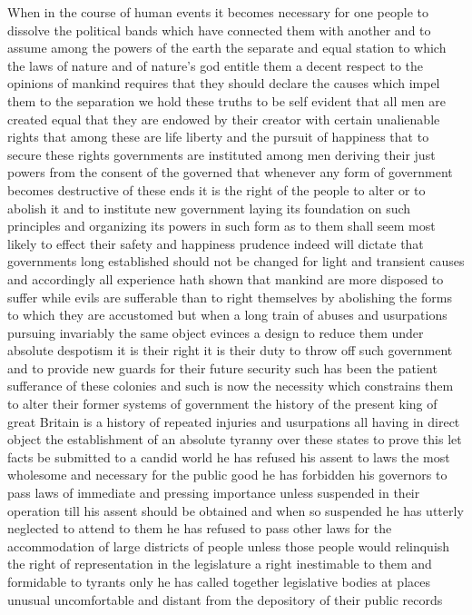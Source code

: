 When in the course of human events it becomes necessary for one people
to dissolve the political bands which have connected them with another
and to assume among the powers of the earth the separate and equal
station to which the laws of nature and of nature's god entitle them a
decent respect to the opinions of mankind requires that they should
declare the causes which impel them to the separation we hold these
truths to be self evident that all men are created equal that they are
endowed by their creator with certain unalienable rights that among
these are life liberty and the pursuit of happiness that to secure these
rights governments are instituted among men deriving their just powers
from the consent of the governed that whenever any form of government
becomes destructive of these ends it is the right of the people to alter
or to abolish it and to institute new government laying its foundation
on such principles and organizing its powers in such form as to them
shall seem most likely to effect their safety and happiness prudence
indeed will dictate that governments long established should not be
changed for light and transient causes and accordingly all experience
hath shown that mankind are more disposed to suffer while evils are
sufferable than to right themselves by abolishing the forms to which
they are accustomed but when a long train of abuses and usurpations
pursuing invariably the same object evinces a design to reduce them
under absolute despotism it is their right it is their duty to throw off
such government and to provide new guards for their future security such
has been the patient sufferance of these colonies and such is now the
necessity which constrains them to alter their former systems of
government the history of the present king of great Britain is a history
of repeated injuries and usurpations all having in direct object the
establishment of an absolute tyranny over these states to prove this let
facts be submitted to a candid world he has refused his assent to laws
the most wholesome and necessary for the public good he has forbidden
his governors to pass laws of immediate and pressing importance unless
suspended in their operation till his assent should be obtained and when
so suspended he has utterly neglected to attend to them he has refused
to pass other laws for the accommodation of large districts of people
unless those people would relinquish the right of representation in the
legislature a right inestimable to them and formidable to tyrants only
he has called together legislative bodies at places unusual
uncomfortable and distant from the depository of their public records
